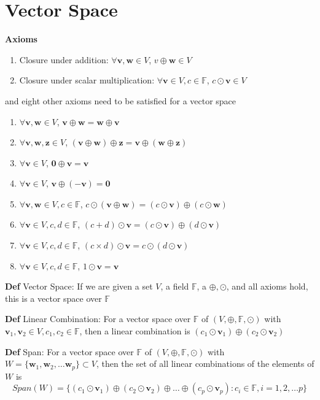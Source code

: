 \documentclass[11pt,notitlepage]{report}
\newcommand{\bb}[1]{\ensuremath{\mathbb{#1}}}
\newcommand{\tbf}[1]{\textbf{#1}}
\begin{document}
\section{Vector Space}

\textbf{Axioms}
\begin{enumerate}[label=(\Roman*)]
    \item Closure under addition: $\forall \tbf v, \tbf w \in V$, $v \oplus \tbf w \in V$
    \item Closure under scalar multiplication: $\forall \tbf v \in V, c \in \bb F$, $c \odot \tbf v \in V$
\end{enumerate} and eight other axioms need to be satisfied for a vector space
\begin{enumerate}[label=(\alph*)]
    \item $\forall \tbf v, \tbf w \in V$, $\tbf v \oplus \tbf w = \tbf w \oplus \tbf v$
    \item $\forall \tbf v, \tbf w, \tbf z \in V$, $(\tbf v \oplus \tbf w) \oplus \tbf z = \tbf v \oplus (\tbf w \oplus \tbf z)$
    \item $\forall \tbf v \in V$, $\tbf 0 \oplus \tbf v = \tbf v$
    \item $\forall \tbf v \in V$, $\tbf v \oplus (-\tbf v) = \tbf 0$
    \item $\forall \tbf v, \tbf w \in V, c \in \bb F$, $c \odot (\tbf v \oplus \tbf w) = (c \odot \tbf v) \oplus (c \odot \tbf w)$
    \item $\forall \tbf v \in V, c, d \in \bb F$, $(c + d) \odot \tbf v = (c \odot \tbf v) \oplus (d \odot \tbf v)$
    \item $\forall \tbf v \in V, c, d \in \bb F$, $(c \times d) \odot \tbf v = c \odot (d \odot \tbf v)$
    \item $\forall \tbf v \in V, c, d \in \bb F$, $1 \odot \tbf v = \tbf v$
\end{enumerate} 

\textbf{Def} Vector Space: If we are given a set $V$, a field $\bb F$, a $\oplus, \odot$, and all axioms hold, this is a vector space over $\bb F$

\textbf{Def} Linear Combination: For a vector space over $\bb F$ of $(V, \oplus, \bb F, \odot)$ with $\tbf v_1, \tbf v_2 \in V, c_1, c_2 \in \bb F$, then a linear combination is $(c_1 \odot \tbf v_1) \oplus (c_2 \odot \tbf v_2)$

\textbf{Def} Span: For a vector space over $\bb F$ of $(V, \oplus, \bb F, \odot)$ with $W = \{\tbf w_1, \tbf w_2, \dots \tbf w_p\} \subset V$, then the set of all linear combinations of the elements of $W$ is
$$Span(W) = \{(c_1 \odot \tbf v_1) \oplus (c_2 \odot \tbf v_2) \oplus \dots \oplus (c_p \odot \tbf v_p): c_i \in \bb F, i = 1, 2, \dots p\}$$
\end{document}
